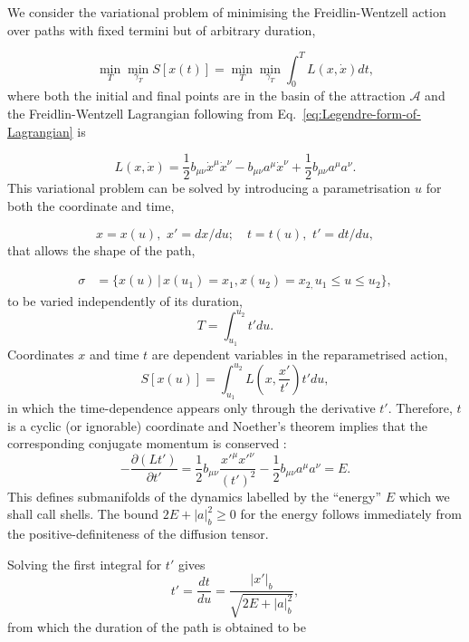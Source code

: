 We consider the variational problem of minimising the Freidlin-Wentzell
action over paths with fixed termini but of arbitrary duration,

\begin{equation}
\min_{T}\min_{\gamma_{T}}S[x(t)]=\min_{T}\min_{\gamma_{T}}\int_{0}^{T}L(x,\dot{x})dt,
\end{equation}
where both the initial and final points are in the basin of the attraction
$\mathcal{A}$ and the Freidlin-Wentzell Lagrangian following from
Eq.~\ref{eq:Legendre-form-of-Lagrangian} is 

\begin{equation}
L(x,\dot{x})=\frac{1}{2}b_{\mu\nu}\dot{x}^{\mu}\dot{x}^{\nu}-b_{\mu\nu}a^{\mu}\dot{x}^{\nu}+\frac{1}{2}b_{\mu\nu}a^{\mu}a^{\nu}.
\end{equation}
This variational problem can be solved by introducing a parametrisation
$u$ for both the coordinate and time,

\[
x=x(u),\,\,x'=dx/du;\quad t=t(u),\,\,t'=dt/du,
\]
that allows the shape of the path, 

\begin{align*}
\sigma & =\{x(u)\,|\,x(u_{1})=x_{1},x(u_{2})=x_{2,}u_{1}\leq u\leq u_{2}\},
\end{align*}
to be varied independently of its duration, 
\[
T=\int_{u_{1}}^{u_{2}}t'du.
\]
Coordinates $x$ and time $t$ are dependent variables in the reparametrised
action,
\begin{equation}
S[x(u)]=\int_{u_{1}}^{u_{2}}L(x,\frac{x'}{t'})t'du,\label{eq:reparametrised-action}
\end{equation}
in which the time-dependence appears only through the derivative $t'$.
Therefore, $t$ is a cyclic (or ignorable) coordinate and Noether's
theorem implies that the corresponding conjugate momentum is conserved
\citep{whittaker1988}:
\begin{equation}
-\frac{\partial(Lt')}{\partial t'}=\frac{1}{2}b_{\mu\nu}\frac{x'^{\mu}x'^{\nu}}{(t')^{2}}-\frac{1}{2}b_{\mu\nu}a^{\mu}a^{\nu}=E.\label{eq:energy first integral}
\end{equation}
This defines submanifolds of the dynamics labelled by the ``energy''
$E$ which we shall call shells. The bound $2E+|a|_{b}^{2}\geq0$
for the energy follows immediately from the positive-definiteness
of the diffusion tensor. 

Solving the first integral for $t'$ gives
\begin{equation}
t'=\frac{dt}{du}=\frac{|x'|_{b}}{\sqrt{2E+|a|_{b}^{2}}},\label{eq:tprime}
\end{equation}
from which the duration of the path is obtained to be 

